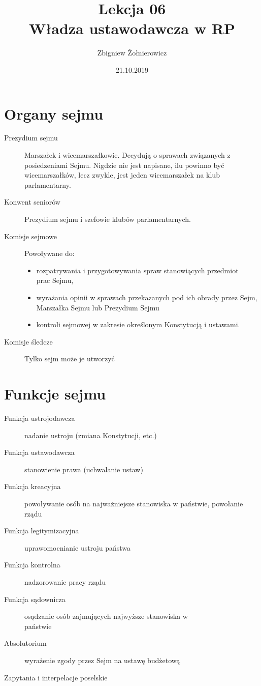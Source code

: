 \documentclass[a4paper]{article}
\begin{document}
\title{{\huge Lekcja 06} \\
{\large Władza ustawodawcza w RP}}
\author{Zbigniew Żołnierowicz}
\date{21.10.2019}
\maketitle
\section{Organy sejmu}
\begin{description}
    \item[Prezydium sejmu] Marszałek i wicemarszałkowie. Decydują o sprawach zwią\-zanych z posiedzeniami Sejmu.
    Nigdzie nie jest napisane, ilu powinno być wicemarszałków, lecz zwykle, jest jeden wicemarszałek na klub parlamentarny.
    \item[Konwent seniorów] Prezydium sejmu i szefowie klubów parlamentarnych.
    \item[Komisje sejmowe] Powoływane do: \begin{itemize}
        \item rozpatrywania i przygotowywania spraw stanowiących przedmiot\\prac Sejmu,
        \item wyrażania opinii w sprawach przekazanych pod ich obrady przez Sejm, Marszałka Sejmu lub Prezydium Sejmu
        \item kontroli sejmowej w zakresie określonym Konstytucją i ustawami.
    \end{itemize}
    \item[Komisje śledcze] Tylko sejm może je utworzyć
\end{description}
\section{Funkcje sejmu}
\begin{description}
    \item[Funkcja ustrojodawcza] nadanie ustroju (zmiana Konstytucji, etc.)
    \item[Funkcja ustawodawcza] stanowienie prawa (uchwalanie ustaw)
    \item[Funkcja kreacyjna] powoływanie osób na najważniejsze stanowiska w państwie, powołanie rządu
    \item[Funkcja legitymizacyjna] uprawomocnianie ustroju państwa
    \item[Funkcja kontrolna] nadzorowanie pracy rządu
    \item[Funkcja sądownicza] osądzanie osób zajmujących najwyższe stanowiska w\\państwie
    \item[Absolutorium] wyrażenie zgody przez Sejm na ustawę budżetową
    \item[Zapytania i interpelacje poselskie]  
\end{description}
\end{document}
